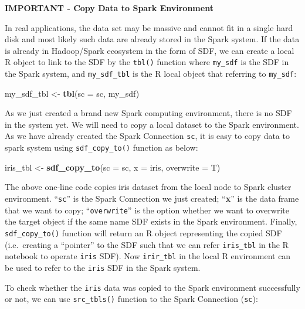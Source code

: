 \documentclass[12pt,]{krantz}
\makeatletter
\newenvironment{Shaded}{\begin{snugshade}}{\end{snugshade}}
\newcommand{\DataTypeTok}[1]{\textcolor[rgb]{0.27,0.27,0.27}{#1}}
\newcommand{\KeywordTok}[1]{\textcolor[rgb]{0.27,0.27,0.27}{\textbf{#1}}}
\newcommand{\NormalTok}[1]{#1}
\newcommand{\StringTok}[1]{\textcolor[rgb]{0.5,0.5,0.5}{#1}}
\newenvironment{kframe}{%
\medskip{}
\setlength{\fboxsep}{.8em}
 \def\at@end@of@kframe{}%
 \ifinner\ifhmode%
  \def\at@end@of@kframe{\end{minipage}}%
  \begin{minipage}{\columnwidth}%
 \fi\fi%
 \def\FrameCommand##1{\hskip\@totalleftmargin \hskip-\fboxsep
 \colorbox{shadecolor}{##1}\hskip-\fboxsep
     \hskip-\linewidth \hskip-\@totalleftmargin \hskip\columnwidth}%
 \MakeFramed {\advance\hsize-\width
   \@totalleftmargin\z@ \linewidth\hsize
   \@setminipage}}%
 {\par\unskip\endMakeFramed%
 \at@end@of@kframe}
\renewenvironment{Shaded}{\begin{kframe}}{\end{kframe}}
\makeatother
\begin{document}
\textbf{IMPORTANT - Copy Data to Spark Environment}

In real applications, the data set may be massive and cannot fit in a single hard disk and most likely such data are already stored in the Spark system. If the data is already in Hadoop/Spark ecosystem in the form of SDF, we can create a local R object to link to the SDF by the \texttt{tbl()} function where \texttt{my\_sdf} is the SDF in the Spark system, and \texttt{my\_sdf\_tbl} is the R local object that referring to \texttt{my\_sdf}:

\begin{Shaded}
\begin{Highlighting}[]
\NormalTok{my_sdf_tbl <-}\StringTok{ }\KeywordTok{tbl}\NormalTok{(}\DataTypeTok{sc =}\NormalTok{ sc, my_sdf)}
\end{Highlighting}
\end{Shaded}

As we just created a brand new Spark computing environment, there is no SDF in the system yet. We will need to copy a local dataset to the Spark environment. As we have already created the Spark Connection \texttt{sc}, it is easy to copy data to spark system using \texttt{sdf\_copy\_to()} function as below:

\begin{Shaded}
\begin{Highlighting}[]
\NormalTok{iris_tbl <-}\StringTok{ }\KeywordTok{sdf_copy_to}\NormalTok{(}\DataTypeTok{sc =}\NormalTok{ sc, }\DataTypeTok{x =}\NormalTok{ iris, }\DataTypeTok{overwrite =}\NormalTok{ T)}
\end{Highlighting}
\end{Shaded}

The above one-line code copies iris dataset from the local node to Spark cluster environment. ``\texttt{sc}'' is the Spark Connection we just created; ``\textbf{x}'' is the data frame that we want to copy; ``\texttt{overwrite}'' is the option whether we want to overwrite the target object if the same name SDF exists in the Spark environment. Finally, \texttt{sdf\_copy\_to()} function will return an R object representing the copied SDF (i.e.~creating a ``pointer'' to the SDF such that we can refer \texttt{iris\_tbl} in the R notebook to operate \texttt{iris} SDF). Now \texttt{irir\_tbl} in the local R environment can be used to refer to the \texttt{iris} SDF in the Spark system.

To check whether the \texttt{iris} data was copied to the Spark environment successfully or not, we can use \texttt{src\_tbls()} function to the Spark Connection (\texttt{sc}):
\end{document}
